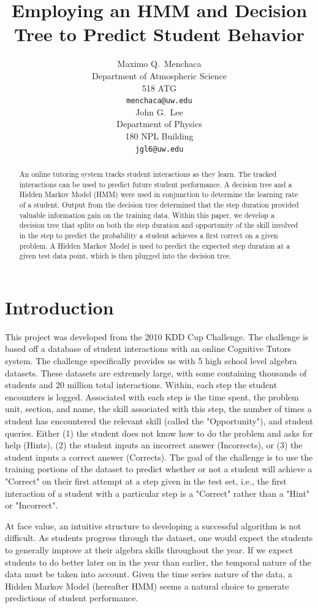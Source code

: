 \documentclass{article} %
\title{Employing an HMM and Decision Tree to Predict Student Behavior}
\author{
Maximo Q.~Menchaca\\
Department of Atmospheric Science\\
518 ATG\\
\texttt{menchaca@uw.edu} \\
\And
John G.~Lee\\
Department of Physics \\
180 NPL Building \\
\texttt{jgl6@uw.edu} \\
}
\begin{document}
\maketitle

\begin{abstract}
An online tutoring system tracks student interactions as they learn. The tracked interactions can be used to predict future student performance. A decision tree and a Hidden Markov Model (HMM) were used in conjunction to determine the learning rate of a student. Output from the decision tree determined that the step duration provided valuable information gain on the training data. Within this paper, we develop a decision tree that splits on both the step duration and opportunity of the skill involved in the step to predict the probability a student achieves a first correct on a given problem. A Hidden Markov Model is used to predict the expected step duration at a given test data point, which is then plugged into the decision tree.
\end{abstract}

\section{Introduction}
This project was developed from the 2010 KDD Cup Challenge. The challenge is based off a database of student interactions with an online Cognitive Tutors system. The challenge specifically provides us with 5 high school level algebra datasets. These datasets are extremely large, with some containing thousands of students and 20 million total interactions. Within, each step the student encounters is logged. Associated with each step is the time spent, the problem unit, section, and name, the skill associated with this step, the number of times a student has encountered the relevant skill (called the "Opportunity"), and student queries. Either (1) the student does not know how to do the problem and asks for help (Hints), (2) the student inputs an incorrect answer (Incorrects), or (3) the student inputs a correct answer (Corrects). The goal of the challenge is to use the training portions of the dataset to predict whether or not a student will achieve a "Correct" on their first attempt at a step given in the test set, i.e., the first interaction of a student with a particular step is a "Correct" rather than a "Hint" or "Incorrect".

At face value, an intuitive structure to developing a successful algorithm is not difficult. As students progress through the dataset, one would expect the students to generally improve at their algebra skills throughout the year. If we expect students to do better later on in the year than earlier, the temporal nature of the data must be taken into account. Given the time series nature of the data, a Hidden Markov Model (hereafter HMM) seems a natural choice to generate predictions of student performance.
\end{document}

